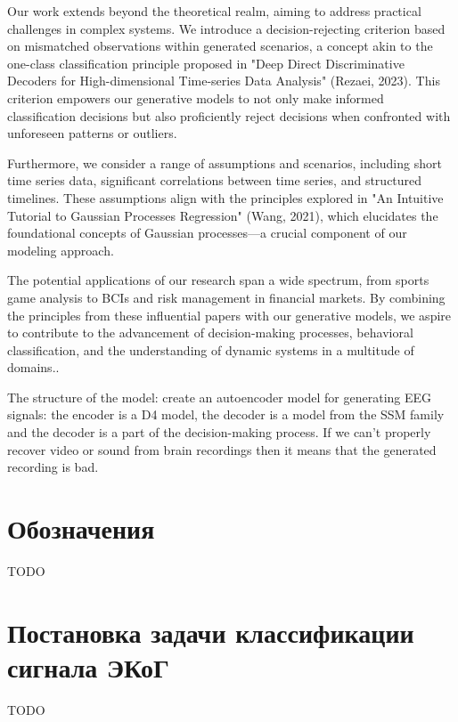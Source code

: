 \documentclass[a4paper, 12pt]{article}
\begin{document}
	Our work extends beyond the theoretical realm, aiming to address practical challenges in complex systems. We introduce a decision-rejecting criterion based on mismatched observations within generated scenarios, a concept akin to the one-class classification principle proposed in "Deep Direct Discriminative Decoders for High-dimensional Time-series Data Analysis" (Rezaei, 2023). This criterion empowers our generative models to not only make informed classification decisions but also proficiently reject decisions when confronted with unforeseen patterns or outliers.
	
	Furthermore, we consider a range of assumptions and scenarios, including short time series data, significant correlations between time series, and structured timelines. These assumptions align with the principles explored in "An Intuitive Tutorial to Gaussian Processes Regression" (Wang, 2021), which elucidates the foundational concepts of Gaussian processes—a crucial component of our modeling approach.
	
	The potential applications of our research span a wide spectrum, from sports game analysis to BCIs and risk management in financial markets. By combining the principles from these influential papers with our generative models, we aspire to contribute to the advancement of decision-making processes, behavioral classification, and the understanding of dynamic systems in a multitude of domains..
	
	The structure of the model: create an autoencoder model for generating EEG signals: the encoder is a D4 model, the decoder is a model from the SSM family and the decoder is a part of the decision-making process. If we can't properly recover video or sound from brain recordings then it means that the generated recording is bad.

\section{Обозначения}

TODO

\section{Постановка задачи классификации сигнала ЭКоГ}
TODO
\end{document}
